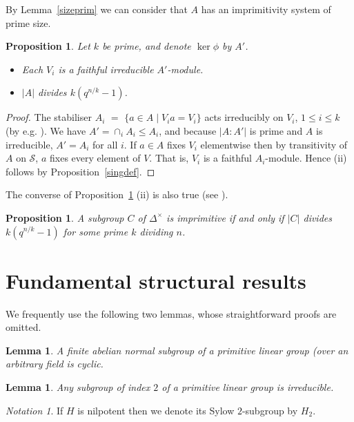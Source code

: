 \documentclass[12pt]{amsart}
\newtheorem{lemma}[theorem]{Lemma}
\newtheorem{proposition}[theorem]{Proposition}
\theoremstyle{definition}
\theoremstyle{remark}
\newtheorem*{notation}{Notation}
\begin{document}
 By Lemma~\ref{sizeprim} we can consider that 
 $A$ has an imprimitivity system of prime size.
\begin{proposition}
\label{likesim}
 Let $k$ be prime, and denote $\ker \phi$ by $A'$.
\begin{itemize}
\item[{\rm (i)}]  Each $V_i$   
 is a faithful irreducible $A'$-module.
\item[{\rm (ii)}]  
 $|A|$ divides $k(q^{n/k}-1)$.
\end{itemize}
\end{proposition}
\begin{proof}
 The stabiliser $A_i$ $=$
 $\{ a\in A \mid V_i a =V_i \}$ acts irreducibly
 on $V_i$, $1\leq i \leq k$  
 (by \mbox{e.g.} \cite[Theorem 4.2B, p.68]{Dixon}).
 We have $A'= \cap_i A_i \leq A_i$, and because $|A : A'|$ is prime
 and $A$ is irreducible, $A'=A_i$ for all $i$. 
 If $a \in A$ fixes $V_i$ elementwise then by transitivity
 of $A$ on $\mathcal{S}$, $a$ fixes every element of
 $V$. That is, $V_i$ is a faithful $A_i$-module. Hence (ii) 
 follows by Proposition~\ref{singdef}.   
\end{proof}

 The converse of Proposition~\ref{likesim} (ii) is also true
 (see \cite[2.6]{Sim}).
\begin{proposition}
\label{likersim}
 A subgroup $C$ of  $\Delta^{\! \times}$  is 
 imprimitive if and only if $|C|$ divides 
 $k(q^{n/k}-1)$ for some prime $k$ dividing  $n$.
\end{proposition}

\section{Fundamental structural results}
\label{fund}

 We frequently use the following two lemmas, 
 whose straightforward proofs are omitted.
\begin{lemma}
\label{abnorsgp}
 A finite abelian normal subgroup of a primitive
 linear group 
 {\em (}over an arbitrary field\hspace*{.7mm}{\em )} 
 is cyclic.
\end{lemma}

\begin{lemma}
\label{ind2prim} 
 Any subgroup of index $2$ of a primitive linear group 
 is irreducible.
\end{lemma}

\begin{notation}
 If $H$ is nilpotent then we denote its Sylow $2$-subgroup 
 by $H_2$.
\end{notation}
\end{document}
